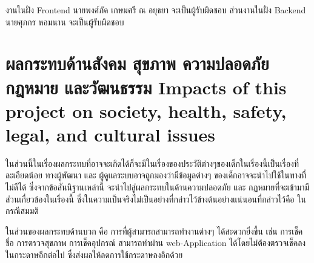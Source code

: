 งานในฝั่ง Frontend นายพงศ์ภัค เกษมศรี ณ อยุธยา จะเป็นผู้รับผิดชอบ 
ส่วนงานในฝั่ง Backend นายศุภกร หอมนาน  จะเป็นผู้รับผิดชอบ


\section{\ifcpe%
ผลกระทบด้านสังคม สุขภาพ ความปลอดภัย กฎหมาย และวัฒนธรรม
\else%
Impacts of this project on society, health, safety, legal, and cultural issues
\fi}

ในส่วนนี้ในเรื่องผลกระทบที่อาจจะเกิดได้ก็จะมีในเรื่องของประวัติต่างๆของเด็กในเรื่องนี้เป็นเรื่องที่ละเอียดน้อย ทางผู้พัฒนา และ ผู้ดูแลระบบอาจถูกมองว่ามีข้อมูลต่างๆ ของเด็กอาจจะนำไปใช้ในทางที่ไม่ดีได้  ซึ่งจากข้อสันนิฐานเหล่านี้ จะนำไปสู่ผลกระทบในด้านความปลอดภัย และ กฏหมายที่จะเข้ามามีส่วนเกี่ยวข้องในเรื่องนี้ ซึ่งในความเป็นจริงไม่เป็นอย่างที่กล่าวไว้ข้างต้นอย่างแน่นอนที่กล่าวไว้คือ ในกรณีสมมติ 

ในส่วนของผลกระทบด้านบวก คือ การที่ผู้สามารถสามารถทำงานต่างๆ ได้สะดวกยิ่งขึ้น เช่น การเช็คชื่อ การตรวจสุขภาพ การเช็คอุปกรณ์ สามารถทำผ่าน web-Application ได้โดยไม่ต้องตรวจเช็คลงในกระดาษอีกต่อไป ซึ่งส่งผลให้ลดการใช้กระดาษลงอีกด้วย

